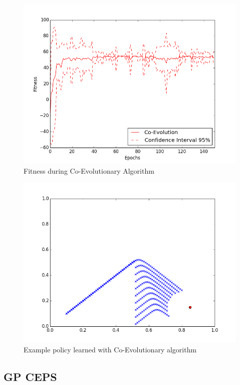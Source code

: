 \begin{figure}[!htb]
  \centering
  \includegraphics[scale=0.5]{images/co_evo.png}
  \caption{Fitness during Co-Evolutionary Algorithm}\label{Fitness during Co-Evolutionary Algorithm}
\end{figure}

\begin{figure}[!htb]
  \centering
  \includegraphics[scale=0.5]{images/co_evo_result.png}
  \caption{Example policy learned with Co-Evolutionary algorithm}\label{Example policy learned with Co-Evolutionary algorithm}
\end{figure}

\subsection{GP CEPS}

